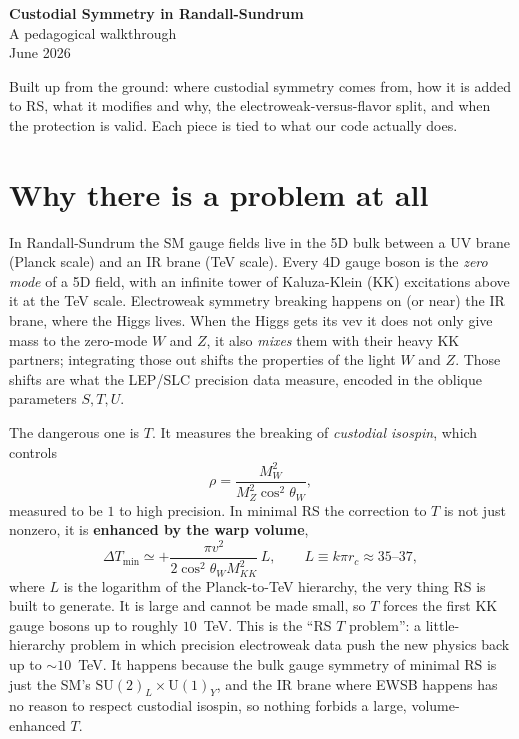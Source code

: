 \documentclass[11pt]{article}
\begin{document}
\begin{center}
{\Large\bfseries Custodial Symmetry in Randall-Sundrum}\\[2pt]
{\large A pedagogical walkthrough}\\[4pt]
{\small June 2026}
\end{center}

\vspace{0.5em}
Built up from the ground: where custodial symmetry comes from, how it is added to
RS, what it modifies and why, the electroweak-versus-flavor split, and when the
protection is valid. Each piece is tied to what our code actually does.

\section{Why there is a problem at all}

In Randall-Sundrum the SM gauge fields live in the 5D bulk between a UV brane
(Planck scale) and an IR brane (TeV scale). Every 4D gauge boson is the
\emph{zero mode} of a 5D field, with an infinite tower of Kaluza-Klein (KK)
excitations above it at the TeV scale. Electroweak symmetry breaking happens on (or
near) the IR brane, where the Higgs lives. When the Higgs gets its vev it does not
only give mass to the zero-mode $W$ and $Z$, it also \emph{mixes} them with their
heavy KK partners; integrating those out shifts the properties of the light $W$ and
$Z$. Those shifts are what the LEP/SLC precision data measure, encoded in the
oblique parameters $S,T,U$.

The dangerous one is $T$. It measures the breaking of \emph{custodial isospin},
which controls
\[
\rho = \frac{M_W^2}{M_Z^2\cos^2\theta_W},
\]
measured to be $1$ to high precision. In minimal RS the correction to $T$ is not
just nonzero, it is \textbf{enhanced by the warp volume},
\[
\Delta T_{\min}\simeq +\frac{\pi v^2}{2\cos^2\theta_W M_{KK}^2}\,L,
\qquad L\equiv k\pi r_c\approx 35\text{--}37,
\]
where $L$ is the logarithm of the Planck-to-TeV hierarchy, the very thing RS is
built to generate. It is large and cannot be made small, so $T$ forces the first KK
gauge bosons up to roughly $10$~TeV. This is the ``RS $T$ problem'': a little-hierarchy
problem in which precision electroweak data push the new physics back up to
$\sim\!10$~TeV. It happens because the bulk gauge symmetry of minimal RS is just the
SM's $\mathrm{SU(2)}_L\times\mathrm{U(1)}_Y$, and the IR brane where EWSB happens has
no reason to respect custodial isospin, so nothing forbids a large, volume-enhanced
$T$.
\end{document}
